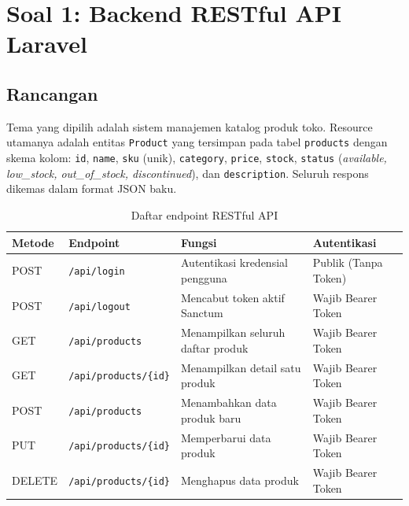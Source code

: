 \documentclass[11pt,a4paper]{article}
\begin{document}
\section{Soal 1: Backend RESTful API Laravel}

\subsection{Rancangan}
Tema yang dipilih adalah sistem manajemen katalog produk toko. Resource utamanya adalah entitas \texttt{Product} yang tersimpan pada tabel \texttt{products} dengan skema kolom: \texttt{id}, \texttt{name}, \texttt{sku} (unik), \texttt{category}, \texttt{price}, \texttt{stock}, \texttt{status} (\textit{available, low\_stock, out\_of\_stock, discontinued}), dan \texttt{description}. Seluruh respons dikemas dalam format JSON baku.

\begin{table}[H]
\centering
\caption{Daftar endpoint RESTful API}
\begin{tabular}{llll}
\toprule
\textbf{Metode} & \textbf{Endpoint} & \textbf{Fungsi} & \textbf{Autentikasi} \\
\midrule
POST & \texttt{/api/login} & Autentikasi kredensial pengguna & Publik (Tanpa Token) \\
POST & \texttt{/api/logout} & Mencabut token aktif Sanctum & Wajib Bearer Token \\
GET & \texttt{/api/products} & Menampilkan seluruh daftar produk & Wajib Bearer Token \\
GET & \texttt{/api/products/\{id\}} & Menampilkan detail satu produk & Wajib Bearer Token \\
POST & \texttt{/api/products} & Menambahkan data produk baru & Wajib Bearer Token \\
PUT & \texttt{/api/products/\{id\}} & Memperbarui data produk & Wajib Bearer Token \\
DELETE & \texttt{/api/products/\{id\}} & Menghapus data produk & Wajib Bearer Token \\
\bottomrule
\end{tabular}
\end{table}
\end{document}
